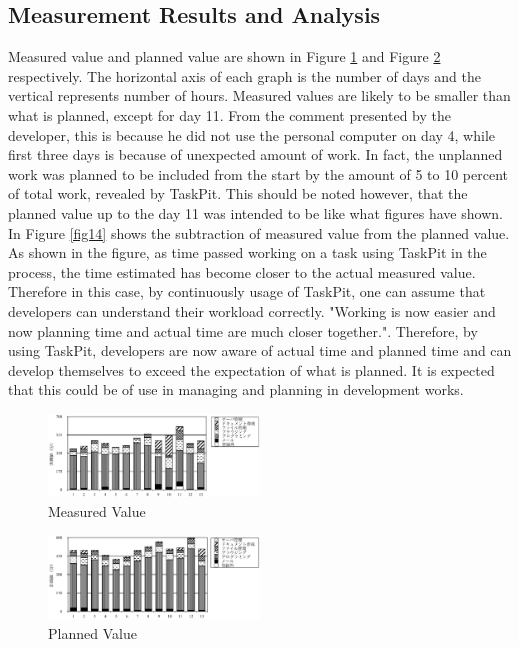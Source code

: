 \documentclass [paper]{ieice}
\begin{document}
\subsection{Measurement Results and Analysis}
	Measured value and planned value are shown in Figure \ref{fig12} and Figure \ref{fig13} respectively. The horizontal axis of each graph is the number of days and the vertical represents number of hours. Measured values are likely to be smaller than what is planned, except for day 11. From the comment presented by the developer, this is because he did not use the personal computer on day 4, while first three days is because of unexpected amount of work. In fact, the unplanned work was planned to be included from the start by the amount of 5 to 10 percent of total work, revealed by TaskPit. This should be noted however, that the planned value up to the day 11 was intended to be like what figures have shown.
	In Figure \ref{fig14} shows the subtraction of measured value from the planned value. As shown in the figure, as time passed working on a task using TaskPit in the process, the time estimated has become closer to the actual measured value. Therefore in this case, by continuously usage of TaskPit, one can assume that developers can understand their workload correctly. "Working is now easier and now planning time and actual time are much closer together.". Therefore, by using TaskPit, developers are now aware of actual time and planned time and can develop themselves to exceed the expectation of what is planned. It is expected that this could be of use in managing and planning in development works. 

\begin{figure}[h]
	\centering	
\includegraphics[width=0.5\textwidth]{fig12}
	\caption{Measured Value}
	\label{fig12}
\end{figure}

\begin{figure}[h]
	\centering	
\includegraphics[width=0.5\textwidth]{fig13}
	\caption{Planned Value}
	\label{fig13}
\end{figure}
\end{document}
